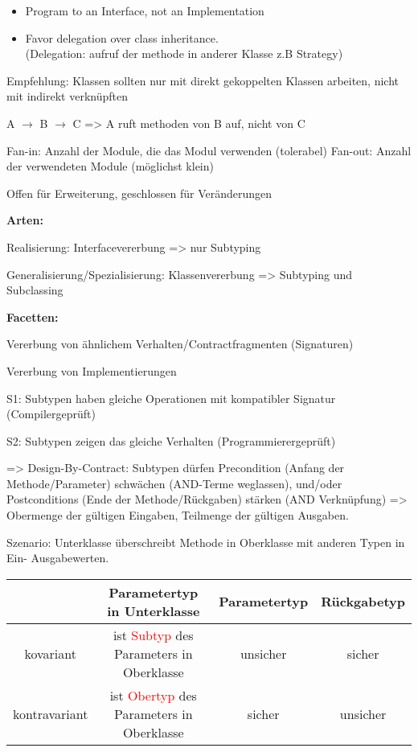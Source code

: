 \begin{itemize}
\item Program to an Interface, not an Implementation
\item Favor delegation over class inheritance. \\(Delegation: aufruf der methode in anderer Klasse z.B Strategy)
\end{itemize}

Empfehlung: Klassen sollten nur mit direkt gekoppelten Klassen arbeiten, nicht mit indirekt verknüpften

A $\rightarrow$ B $\rightarrow$ C => A ruft methoden von B auf, nicht von C

Fan-in: Anzahl der Module, die das Modul verwenden (tolerabel)
Fan-out: Anzahl der verwendeten Module (möglichst klein)

Offen für Erweiterung, geschlossen für Veränderungen



\textbf{Arten:}

Realisierung: Interfacevererbung => nur Subtyping

Generalisierung/Spezialisierung: Klassenvererbung => Subtyping und Subclassing

\textbf{Facetten:}

 Vererbung von ähnlichem Verhalten/Contractfragmenten (Signaturen) 

 Vererbung von Implementierungen 


S1: Subtypen haben gleiche Operationen mit kompatibler Signatur (Compilergeprüft)

S2: Subtypen zeigen das gleiche Verhalten (Programmierergeprüft)

=> Design-By-Contract: Subtypen dürfen Precondition (Anfang der Methode/Parameter) schwächen (AND-Terme weglassen), und/oder Postconditions (Ende der Methode/Rückgaben) stärken (AND Verknüpfung) => Obermenge der gültigen Eingaben, Teilmenge der gültigen Ausgaben.

Szenario: Unterklasse überschreibt Methode in Oberklasse mit anderen Typen in Ein- Ausgabewerten.

\begin{tabular}{|c|c|c|c|}
\hline	
& Parametertyp in Unterklasse & Parametertyp & Rückgabetyp \\
\hline
kovariant & ist \textcolor{red}{Subtyp} des Parameters in Oberklasse & unsicher & sicher\\
\hline
kontravariant & ist \textcolor{red}{Obertyp} des Parameters in Oberklasse & sicher & unsicher \\
\hline
\end{tabular}
